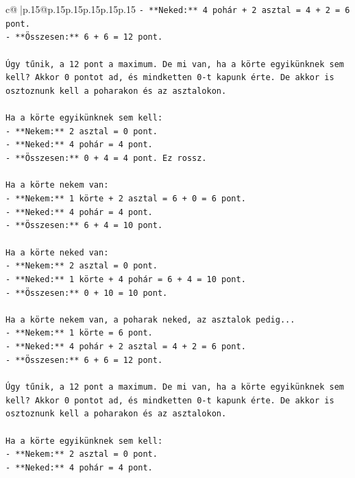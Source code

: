 \documentclass{article}
\begin{document}
{\begin{supertabular}{c@{$\;$}|p{.15\linewidth}@{}p{.15\linewidth}p{.15\linewidth}p{.15\linewidth}p{.15\linewidth}p{.15\linewidth}}
{{{\texttt{{-} **Neked:** 4 pohár + 2 asztal = 4 + 2 = 6 pont.} \\
\texttt{{-} **Összesen:** 6 + 6 = 12 pont.} \\
\\ 
\texttt{Úgy tűnik, a 12 pont a maximum. De mi van, ha a körte egyikünknek sem kell? Akkor 0 pontot ad, és mindketten 0{-}t kapunk érte. De akkor is osztoznunk kell a poharakon és az asztalokon.} \\
\\ 
\texttt{Ha a körte egyikünknek sem kell:} \\
\texttt{{-} **Nekem:** 2 asztal = 0 pont.} \\
\texttt{{-} **Neked:** 4 pohár = 4 pont.} \\
\texttt{{-} **Összesen:** 0 + 4 = 4 pont. Ez rossz.} \\
\\ 
\texttt{Ha a körte nekem van:} \\
\texttt{{-} **Nekem:** 1 körte + 2 asztal = 6 + 0 = 6 pont.} \\
\texttt{{-} **Neked:** 4 pohár = 4 pont.} \\
\texttt{{-} **Összesen:** 6 + 4 = 10 pont.} \\
\\ 
\texttt{Ha a körte neked van:} \\
\texttt{{-} **Nekem:** 2 asztal = 0 pont.} \\
\texttt{{-} **Neked:** 1 körte + 4 pohár = 6 + 4 = 10 pont.} \\
\texttt{{-} **Összesen:** 0 + 10 = 10 pont.} \\
\\ 
\texttt{Ha a körte nekem van, a poharak neked, az asztalok pedig...} \\
\texttt{{-} **Nekem:** 1 körte = 6 pont.} \\
\texttt{{-} **Neked:** 4 pohár + 2 asztal = 4 + 2 = 6 pont.} \\
\texttt{{-} **Összesen:** 6 + 6 = 12 pont.} \\
\\ 
\texttt{Úgy tűnik, a 12 pont a maximum. De mi van, ha a körte egyikünknek sem kell? Akkor 0 pontot ad, és mindketten 0{-}t kapunk érte. De akkor is osztoznunk kell a poharakon és az asztalokon.} \\
\\ 
\texttt{Ha a körte egyikünknek sem kell:} \\
\texttt{{-} **Nekem:** 2 asztal = 0 pont.} \\
\texttt{{-} **Neked:** 4 pohár = 4 pont.} \\
}}}
\end{supertabular}}
\end{document}
